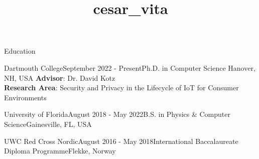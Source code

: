 \documentclass{resume} %
\begin{document}
\title{cesar_vita}

\begin{rSection}{Education}

\begin{rSubsection}{Dartmouth College}{September 2022 - Present}{Ph.D. in Computer Science }{Hanover, NH, USA}
  \vspace{-.1cm}
  \textbf{Advisor}: Dr. David Kotz\\ \textbf{Research Area}: Security and Privacy in the Lifecycle of IoT for Consumer
Environments
  \vspace{-.65cm}
  \item[]
\end{rSubsection}

\begin{rSubsection}{University of Florida}{August 2018 - May 2022}{B.S. in Physics \& Computer Science}{Gainesville, FL, USA}
  \vspace{-.65cm}
  \item[]
\end{rSubsection}

\begin{rSubsection}{UWC Red Cross Nordic}{August 2016 - May 2018}{International Baccalaureate Diploma Programme}{Flekke, Norway}
  \vspace{-.65cm}
  \item[]
\end{rSubsection}
\end{rSection}
\end{document}
